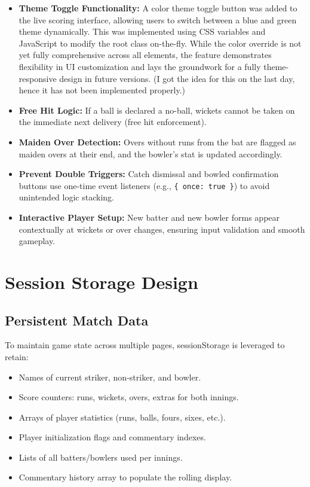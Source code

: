\documentclass[a4paper,10pt]{article}
\begin{document}
\begin{itemize}
\item \textbf{Theme Toggle Functionality:} A color theme toggle button was added to the live scoring interface, allowing users to switch between a blue and green theme dynamically. This was implemented using CSS variables and JavaScript to modify the root class on-the-fly. While the color override is not yet fully comprehensive across all elements, the feature demonstrates flexibility in UI customization and lays the groundwork for a fully theme-responsive design in future versions.
(I got the idea for this on the last day, hence it has not been implemented properly.)
    \item \textbf{Free Hit Logic:} If a ball is declared a no-ball, wickets cannot be taken on the immediate next delivery (free hit enforcement).
    \item \textbf{Maiden Over Detection:} Overs without runs from the bat are flagged as maiden overs at their end, and the bowler's stat is updated accordingly.
    \item \textbf{Prevent Double Triggers:} Catch dismissal and bowled confirmation buttons use one-time event listeners (e.g., \texttt{\{ once: true \}}) to avoid unintended logic stacking.
    \item \textbf{Interactive Player Setup:} New batter and new bowler forms appear contextually at wickets or over changes, ensuring input validation and smooth gameplay.
\end{itemize}

\section{Session Storage Design}
\subsection{Persistent Match Data}
To maintain game state across multiple pages, sessionStorage is leveraged to retain:
\begin{itemize}
    \item Names of current striker, non-striker, and bowler.
    \item Score counters: runs, wickets, overs, extras for both innings.
    \item Arrays of player statistics (runs, balls, fours, sixes, etc.).
    \item Player initialization flags and commentary indexes.
    \item Lists of all batters/bowlers used per innings.
    \item Commentary history array to populate the rolling display.
\end{itemize}
\end{document}
